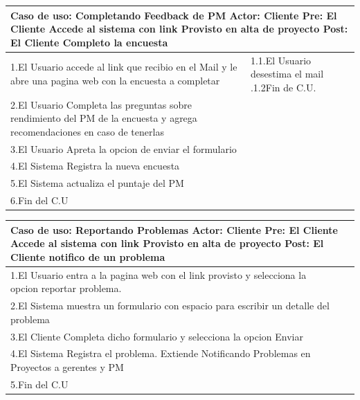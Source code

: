 \begin{longtable}{|p{}|p{}|}
    \hline
    \multicolumn{2}{|p{16cm}|}{
        \textbf{Caso de uso:} Completando Feedback de PM\newline
        \textbf{Actor:} Cliente\newline
        \textbf{Pre: }El Cliente Accede al sistema con link Provisto en alta de proyecto\newline
        \textbf{Post: }El Cliente Completo la encuesta
    }\\
    \hline
    1.El Usuario accede al link que recibio en el Mail y le abre una pagina web con la encuesta a completar & 1.1.El Usuario desestima el mail .\newline 1.2Fin de C.U.\\
    \hline
    2.El Usuario Completa las preguntas sobre rendimiento del PM de la encuesta y agrega recomendaciones en caso de tenerlas&    \\
    \hline
    3.El Usuario Apreta la opcion de enviar el formulario& \\
    \hline
    4.El Sistema Registra la nueva encuesta&\\
    \hline
    5.El Sistema actualiza el puntaje del PM&\\
    \hline
    6.Fin del C.U&\\
    \hline
\end{longtable}

\begin{longtable}{|p{}|p{}|}
    \hline
    \multicolumn{2}{|p{16cm}|}{
        \textbf{Caso de uso:} Reportando Problemas\newline
        \textbf{Actor:} Cliente\newline
        \textbf{Pre: }El Cliente Accede al sistema con link Provisto en alta de proyecto\newline
        \textbf{Post: }El Cliente notifico de un problema
    }\\
    \hline
    1.El Usuario entra a la pagina web con el link provisto y selecciona la opcion reportar problema.&\\
    \hline
    2.El Sistema muestra un formulario con espacio para escribir un detalle del problema&    \\
    \hline
    3.El Cliente Completa dicho formulario y selecciona la opcion Enviar& \\
    \hline
    4.El Sistema Registra el problema. Extiende Notificando Problemas en Proyectos a gerentes y PM&\\
    \hline
    5.Fin del C.U&\\
    \hline
\end{longtable}

